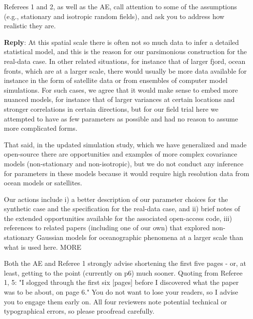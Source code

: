\documentclass[a4paper]{article}
\newcounter{reviewer}
\def\reply{\textbf{Reply}}
\begin{document}
\vspace{5mm}

Referees 1 and 2, as well as the AE, call attention to some of
the assumptions (e.g., stationary and isotropic random fields),
and ask you to address how realistic they are.

\reply: At this spatial scale there is often not so much data to infer a detailed statistical model, and this is the reason for our parsimonious construction for the real-data case. In other related situations, for instance that of larger fjord, ocean fronts, which are at a larger scale, there would usually be more data available for instance in the form of satellite data or from ensembles of computer model simulations. For such cases, we agree that it would make sense to embed more nuanced models, for instance that of larger variances at certain locations and stronger correlations in certain directions, but for our field trial here we attempted to have as few parameters as possible and had no reason to assume more complicated forms. 

That said, in the updated simulation study, which we have generalized and made open-source there are opportunities and examples of more complex covariance models (non-stationary and non-isotropic), but we do not conduct any inference for parameters in these models because it would require high resolution data from ocean models or satellites. 

Our actions include i) a better description of our parameter choices for the synthetic case and the specification for the real-data case, and ii) brief notes of the extended opportunities available for the associated open-access code, iii) references to related papers (including one of our own) that explored non-stationary Gaussian models for oceanographic phenomena at a larger scale than what is used here. MORE


\vspace{5mm}

Both the AE and Referee 1 strongly advise shortening the first
five pages - or, at least, getting to the point (currently on p6)
much sooner.  Quoting from  Referee 1, 5: "I slogged through the 
first six [pages] before I discovered what the paper was to be 
about, on page 6."  You do not want to lose your readers, so I
advise you to engage them early on.  All four reviewers note
potential technical or typographical errors, so please proofread
carefully.
\end{document}
